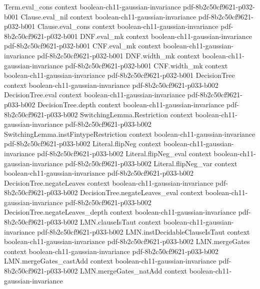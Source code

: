 \begin{theorem}
\proofstep
  {Term.eval_cons}
  {context}
  {boolean-ch11-gaussian-invariance}
  {pdf-8b2c50cf9621-p032-b001}
\proofstep
  {Clause.eval_nil}
  {context}
  {boolean-ch11-gaussian-invariance}
  {pdf-8b2c50cf9621-p032-b001}
\proofstep
  {Clause.eval_cons}
  {context}
  {boolean-ch11-gaussian-invariance}
  {pdf-8b2c50cf9621-p032-b001}
\proofstep
  {DNF.eval_mk}
  {context}
  {boolean-ch11-gaussian-invariance}
  {pdf-8b2c50cf9621-p032-b001}
\proofstep
  {CNF.eval_mk}
  {context}
  {boolean-ch11-gaussian-invariance}
  {pdf-8b2c50cf9621-p032-b001}
\proofstep
  {DNF.width_mk}
  {context}
  {boolean-ch11-gaussian-invariance}
  {pdf-8b2c50cf9621-p032-b001}
\proofstep
  {CNF.width_mk}
  {context}
  {boolean-ch11-gaussian-invariance}
  {pdf-8b2c50cf9621-p032-b001}
\proofstep
  {DecisionTree}
  {context}
  {boolean-ch11-gaussian-invariance}
  {pdf-8b2c50cf9621-p033-b002}
\proofstep
  {DecisionTree.eval}
  {context}
  {boolean-ch11-gaussian-invariance}
  {pdf-8b2c50cf9621-p033-b002}
\proofstep
  {DecisionTree.depth}
  {context}
  {boolean-ch11-gaussian-invariance}
  {pdf-8b2c50cf9621-p033-b002}
\proofstep
  {SwitchingLemma.Restriction}
  {context}
  {boolean-ch11-gaussian-invariance}
  {pdf-8b2c50cf9621-p033-b002}
\proofstep
  {SwitchingLemma.instFintypeRestriction}
  {context}
  {boolean-ch11-gaussian-invariance}
  {pdf-8b2c50cf9621-p033-b002}
\proofstep
  {Literal.flipNeg}
  {context}
  {boolean-ch11-gaussian-invariance}
  {pdf-8b2c50cf9621-p033-b002}
\proofstep
  {Literal.flipNeg_eval}
  {context}
  {boolean-ch11-gaussian-invariance}
  {pdf-8b2c50cf9621-p033-b002}
\proofstep
  {Literal.flipNeg_var}
  {context}
  {boolean-ch11-gaussian-invariance}
  {pdf-8b2c50cf9621-p033-b002}
\proofstep
  {DecisionTree.negateLeaves}
  {context}
  {boolean-ch11-gaussian-invariance}
  {pdf-8b2c50cf9621-p033-b002}
\proofstep
  {DecisionTree.negateLeaves_eval}
  {context}
  {boolean-ch11-gaussian-invariance}
  {pdf-8b2c50cf9621-p033-b002}
\proofstep
  {DecisionTree.negateLeaves_depth}
  {context}
  {boolean-ch11-gaussian-invariance}
  {pdf-8b2c50cf9621-p033-b002}
\proofstep
  {LMN.clauseIsTaut}
  {context}
  {boolean-ch11-gaussian-invariance}
  {pdf-8b2c50cf9621-p033-b002}
\proofstep
  {LMN.instDecidableClauseIsTaut}
  {context}
  {boolean-ch11-gaussian-invariance}
  {pdf-8b2c50cf9621-p033-b002}
\proofstep
  {LMN.mergeGates}
  {context}
  {boolean-ch11-gaussian-invariance}
  {pdf-8b2c50cf9621-p033-b002}
\proofstep
  {LMN.mergeGates_castAdd}
  {context}
  {boolean-ch11-gaussian-invariance}
  {pdf-8b2c50cf9621-p033-b002}
\proofstep
  {LMN.mergeGates_natAdd}
  {context}
  {boolean-ch11-gaussian-invariance}

\end{theorem}
